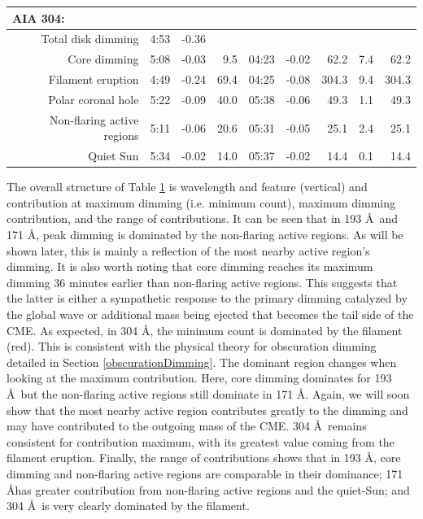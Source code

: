 \begin{table}
\begin{center}
{\begin{tabular}{r|rrr|rrr|r@{-}r}
\multicolumn{1}{l}{AIA 304:} \\
\hline
Total disk dimming & 4:53 & -0.36 & & & & & \\
Core dimming & 5:08 & -0.03 & 9.5 & 04:23 & -0.02 & 62.2 &  7.4 & 62.2 \\
Filament eruption & 4:49 & -0.24 & 69.4 & 04:25 & -0.08 & 304.3 &  9.4 & 304.3 \\
Polar coronal hole & 5:22 & -0.09 & 40.0 & 05:38 & -0.06 & 49.3 &  1.1 & 49.3 \\
Non-flaring active regions & 5:11 & -0.06 & 20.6 & 05:31 & -0.05 & 25.1 &  2.4 & 25.1 \\
Quiet Sun & 5:34 & -0.02 & 14.0 & 05:37 & -0.02 & 14.4 &  0.1 & 14.4 \\
\hline
\end{tabular}
}
\end{center}
\label{tab:aia2011aug4}
\end{table}

The overall structure of Table \ref{tab:aia2011aug4} is wavelength and feature (vertical) and contribution at maximum dimming (i.e. minimum count), maximum dimming contribution, and the range of contributions. It can be seen that in 193 \AA\ and 171 \AA, peak dimming is dominated by the non-flaring active regions. As will be shown later, this is mainly a reflection of the most nearby active region's dimming. It is also worth noting that core dimming reaches its maximum dimming 36 minutes earlier than non-flaring active regions. This suggests that the latter is either a sympathetic response to the primary dimming catalyzed by the global wave or additional mass being ejected that becomes the tail side of the CME. As expected, in 304 \AA, the minimum count is dominated by the filament (red). This is consistent with the physical theory for obscuration dimming detailed in Section \ref{obscurationDimming}. The dominant region changes when looking at the maximum contribution. Here, core dimming dominates for 193 \AA\ but the non-flaring active regions still dominate in 171 \AA. Again, we will soon show that the most nearby active region contributes greatly to the dimming and may have contributed to the outgoing mass of the CME. 304 \AA\ remains consistent for contribution maximum, with its greatest value coming from the filament eruption. Finally, the range of contributions shows that in 193 \AA, core dimming and non-flaring active regions are comparable in their dominance; 171 \AA has greater contribution from non-flaring active regions and the quiet-Sun; and 304 \AA\ is very clearly dominated by the filament. 

